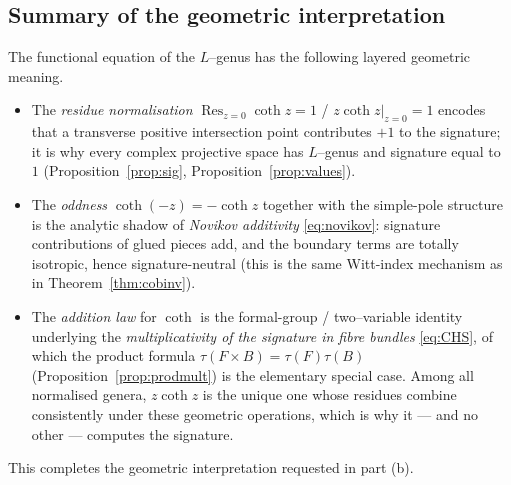 \documentclass[12pt]{article}
\theoremstyle{definition}
\begin{document}
\subsection*{Summary of the geometric interpretation}

The functional equation of the $L$--genus has the following layered geometric meaning.
\begin{itemize}
\item[(a)] The \emph{residue normalisation} $\operatorname{Res}_{z=0}\coth z=1$ /
$z\coth z|_{z=0}=1$ encodes that a transverse positive intersection point contributes
$+1$ to the signature; it is why every complex projective space has $L$--genus and
signature equal to $1$ (Proposition~\ref{prop:sig}, Proposition~\ref{prop:values}).
\item[(b)] The \emph{oddness} $\coth(-z)=-\coth z$ together with the simple-pole
structure is the analytic shadow of \emph{Novikov additivity} \eqref{eq:novikov}: signature
contributions of glued pieces add, and the boundary terms are totally isotropic, hence
signature-neutral (this is the same Witt-index mechanism as in
Theorem~\ref{thm:cobinv}).
\item[(c)] The \emph{addition law} for $\coth$ is the formal-group / two--variable
identity underlying the \emph{multiplicativity of the signature in fibre bundles}
\eqref{eq:CHS}, of which the product formula
$\tau(F\times B)=\tau(F)\tau(B)$ (Proposition~\ref{prop:prodmult}) is the elementary
special case.  Among all normalised genera, $z\coth z$ is the unique one whose residues
combine consistently under these geometric operations, which is why it --- and no other
--- computes the signature.
\end{itemize}
This completes the geometric interpretation requested in part (b).
\end{document}
